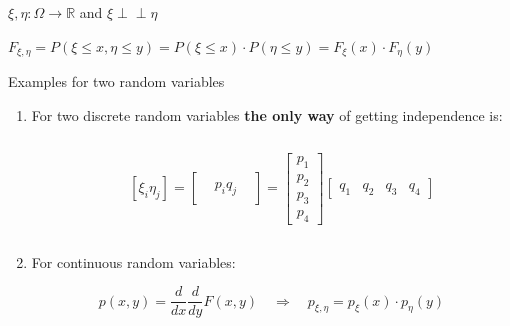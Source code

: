 \documentclass[fullscreen=true, bookmarks=true, hyperref={pdfencoding=unicode}]{beamer}
\newcommand{\indep}{\perp \!\!\! \perp}
\begin{document}
\begin{frame}
  $\xi, \eta: \Omega \to \mathbb{R}$ and $\xi \indep \eta$

  $F_{\xi, \eta} = P(\xi \leq x, \eta \leq y) = 
  P(\xi \leq x)\cdot P(\eta \leq y) = F_{\xi}(x)\cdot F_{\eta}(y)$

  \begin{block}{Examples for two random variables}
    \begin{enumerate}
      \pause\item For two discrete random variables \textbf{the only way} of getting independence is:
      
      \begin{columns}
        \begin{column}{0.4\textwidth}
        \end{column}
        \begin{column}{0.4\textwidth}
          $\left[ \xi_i \eta_j \right] = 
          \begin{bmatrix}
             & & \\
             & p_iq_j& \\
             & & 
          \end{bmatrix} = \begin{bmatrix}
            p_1 \\
            p_2 \\
            p_3 \\
            p_4           
          \end{bmatrix} \begin{bmatrix}
            q_1 & q_2 & q_3 & q_4
          \end{bmatrix}$
        \end{column}
      \end{columns}
      \pause\item For continuous random variables:

      $$p(x, y) = \frac{d}{dx} \frac{d}{dy} F(x,y) \quad \Rightarrow \quad 
      p_{\xi, \eta} = p_{\xi}(x)\cdot p_{\eta}(y)$$
    \end{enumerate}  
  \end{block}
\end{frame}
\end{document}
